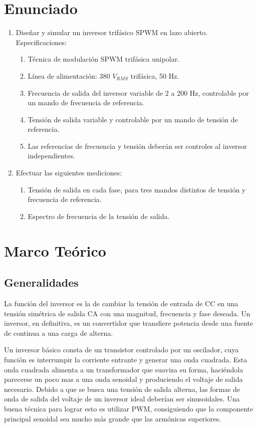\documentclass[11pt, a4paper]{article}
\begin{document}
\section{Enunciado}
\begin{enumerate}
	\item Diseñar y simular un inversor trifásico SPWM en lazo abierto. Especificaciones:
	\begin{enumerate}
		\item Técnica de modulación SPWM trifásica unipolar.
		\item Línea de alimentación: 380 $V_{RMS}$ trifásica, 50 Hz.
		\item Frecuencia de salida del inversor variable de 2 a 200 Hz, controlable por un mando de frecuencia de referencia.
		\item Tensión de salida variable y controlable por un mando de tensión de referencia.
		\item Las referencias de frecuencia y tensión deberán ser controles al inversor independientes.
	\end{enumerate}
	\item Efectuar las siguientes mediciones:
	\begin{enumerate}
		\item Tensión de salida en cada fase, para tres mandos distintos de tensión y frecuencia de referencia.
		\item Espectro de frecuencia de la tensión de salida.
	\end{enumerate}
\end{enumerate}

\section{Marco Teórico}
\subsection{Generalidades}
La función del inversor es la de cambiar la tensión de entrada de CC en una tensión simétrica de salida CA con una magnitud, frecuencia y fase deseada. Un inversor, en definitiva, es un convertidor que transfiere potencia desde una fuente de continua a una carga de alterna. 

Un inversor básico consta de un transistor controlado por un oscilador, cuya función es interrumpir la corriente entrante y generar una onda cuadrada. Esta onda cuadrada alimenta a un transformador que suaviza su forma, haciéndola parecerse un poco mas a una onda senoidal y produciendo el voltaje de salida necesario. Debido a que se busca una tensión de salida alterna, las formas de onda de salida del voltaje de un inversor ideal deberían ser sinusoidales. Una buena técnica para lograr esto es utilizar PWM, consiguiendo que la componente principal senoidal sea mucho más grande que las armónicas superiores.
\end{document}
